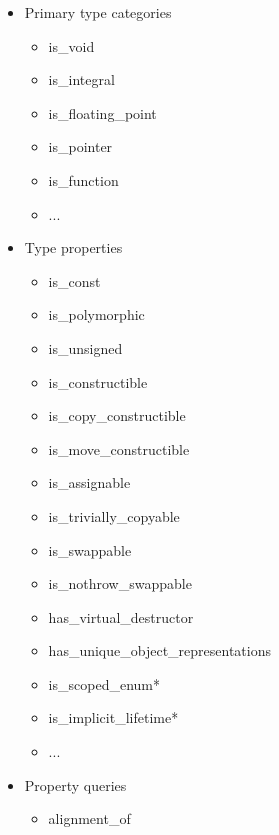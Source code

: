 \begin{itemize}
\item
Primary type categories
\begin{itemize}
\item
is\_void

\item
is\_integral

\item
is\_floating\_point

\item
is\_pointer

\item
is\_function

\item
...
\end{itemize}

\item
Type properties
\begin{itemize}
\item
is\_const

\item
is\_polymorphic

\item
is\_unsigned

\item
is\_constructible

\item
is\_copy\_constructible

\item
is\_move\_constructible

\item
is\_assignable

\item
is\_trivially\_copyable

\item
is\_swappable

\item
is\_nothrow\_swappable

\item
has\_virtual\_destructor

\item
has\_unique\_object\_representations

\item
is\_scoped\_enum*

\item
is\_implicit\_lifetime*

\item
...
\end{itemize}

\item
Property queries
\begin{itemize}
\item
alignment\_of


\end{itemize}
\end{itemize}
